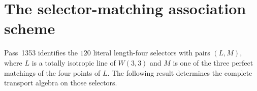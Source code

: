 \makeatletter
{}
\makeatother
\providecommand{\PSp}{\mathrm{PSp}}
\providecommand{\Aut}{\mathrm{Aut}}
\providecommand{\spec}{\operatorname{spec}}


\section{The selector-matching association scheme}
\label{sec:bt1355-bt1359-selector-matching-scheme}

Pass~1353 identifies the $120$ literal length-four selectors with pairs
$(L,M)$, where $L$ is a totally isotropic line of $W(3,3)$ and $M$ is
one of the three perfect matchings of the four points of $L$.  The
following result determines the complete transport algebra on those
selectors.

